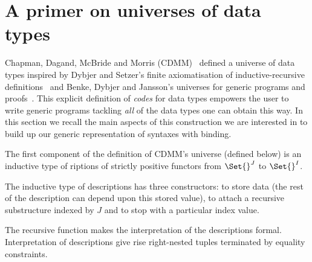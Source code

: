 
\section{A primer on universes of data types}\label{section:data}

Chapman, Dagand, McBride and Morris (CDMM)~\citeyear{Chapman:2010:GAL:1863543.1863547}
defined a universe of data types inspired by Dybjer and Setzer's
finite axiomatisation of inductive-recursive definitions~\citeyear{Dybjer1999}
and Benke, Dybjer and Jansson's universes for generic programs and proofs~\citeyear{benke-ugpp}.
This explicit definition of \emph{codes} for data types empowers the
user to write generic programs tackling \emph{all} of the data types
one can obtain this way. In this section we recall the main aspects
of this construction we are interested in to build up our generic
representation of syntaxes with binding.

The first component of the definition of CDMM's universe (defined below) is an inductive type of
riptions of strictly positive functors from $\Set{}^J$ to $\Set{}^I$.

The inductive type of descriptions has three constructors:
 to store data (the rest of
the description can depend upon this stored value),  to attach a
recursive substructure indexed by $J$ and  to stop
with a particular index value.

The recursive function  makes the interpretation of the
descriptions formal. Interpretation of descriptions give rise
right-nested tuples terminated by equality constraints.

\noindent
\begin{minipage}{\textwidth}
  \begin{minipage}{0.51\textwidth}
    \noindent
  \end{minipage}\quad
  \begin{minipage}{0.4\textwidth}
  \end{minipage}
\end{minipage}


